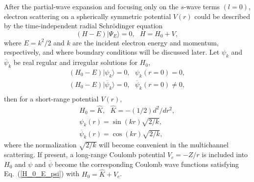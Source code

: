 \documentclass[aip
, pra
, showpacs
, aps
, twocolumn
, groupedaddress
, floatfix
]{revtex4}
\newcommand{\beq}{\begin{equation}}
\newcommand{\eeq}{\end{equation}}
\newcommand{\barr}{\begin{array}}
\newcommand{\earr}{\end{array}}
\begin{document}
After the partial-wave expansion \cite{Taylor72,N82} and focusing only on the $s$-wave terms $(l=0)$,
electron scattering on a spherically symmetric potential $V(r)$
could be described by the time-independent radial Schr\"odinger equation
\beq
(H-E) | \Psi_E \rangle =0,  \ \ \ H = H_0 + V, \label{H_E_Psi_E}
\eeq
where $E=k^2/2$ and $k$ are the incident electron energy and momentum, respectively, and where boundary conditions will be discussed later.
Let $\psi_k$ and $\overline{\psi}_k$ be real regular and irregular solutions for $H_0$,
\beq \barr{l}
(H_0-E) | \psi_k \rangle =0,  \ \ \ \psi_k(r=0) = 0,\\
(H_0-E) | \overline{\psi}_k \rangle =0,  \ \ \ \overline{\psi}_k(r=0) \neq 0,\\
\earr \label{H_0_E_psi}\eeq
then for a short-range potential $V(r)$,
\beq \barr{l}
H_0 = \hat{K},\ \ \ \hat{K} = -(1/2) d^2/dr^2,\\
\psi_k(r) = \sin(kr) \sqrt{2/k},\\
\overline{\psi}_k(r) = \cos(kr) \sqrt{2/k},
\earr \label{K} \eeq
where the normalization $\sqrt{2/k}$ will become convenient in the multichannel scattering.
If present, a long-range Coulomb potential $V_c=-Z/r$ is included into $H_0$
and $\psi$ and $\overline{\psi}$ become the corresponding Coulomb wave functions satisfying Eq.~(\ref{H_0_E_psi})
with $H_0 = \hat{K} + V_c$.
\end{document}
